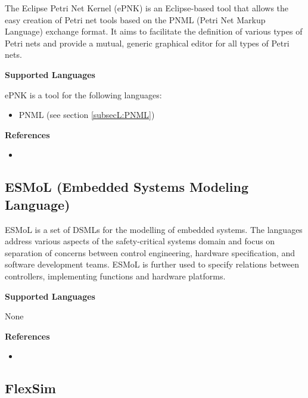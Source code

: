 The Eclipse Petri Net Kernel (ePNK) is an Eclipse-based tool that allows the easy creation of Petri net tools based on the PNML (Petri Net Markup Language) exchange format. It aims to facilitate the definition of various types of Petri nets and provide a mutual, generic graphical editor for all types of Petri nets.

\textbf{Supported Languages}

ePNK is a tool for the following languages:
\begin{itemize}
	\item PNML (see section \ref{subsecL:PNML})
\end{itemize}


\textbf{References}
\begin{itemize}
	
\item {}
\end{itemize}



\subsection{ESMoL (Embedded Systems Modeling Language)}
\label{subsecT:ESMoL}


ESMoL is a set of DSMLs for the modelling of embedded systems. The languages address various aspects of the safety-critical systems domain and focus on separation of concerns between
control engineering, hardware specification, and software development teams. ESMoL is further used to specify relations between controllers, implementing functions and hardware platforms.

\textbf{Supported Languages}

None


\textbf{References}
\begin{itemize}
	
\item {}
\end{itemize}



\subsection{FlexSim}
\label{subsecT:FlexSim}



